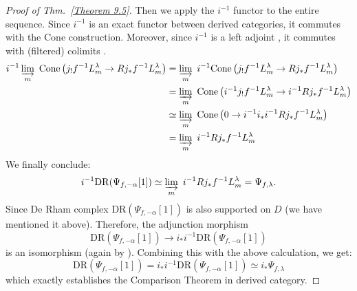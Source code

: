 \begin{proof}[Proof of Thm.~\ref{Theorem 9.5}]
    Then we apply the $i^{-1}$ functor to the entire sequence. Since $i^{-1}$ is an exact functor between derived categories,
    it commutes with the Cone construction. Moreover, since $i^{-1}$ is a left adjoint \cite[\href{https://stacks.math.columbia.edu/tag/00AD}{Tag 00AD}]{stacks-project},
    it commutes with (filtered) colimits \cite[\href{https://stacks.math.columbia.edu/tag/0038}{Tag 0038}]{stacks-project}.
    \begin{align*}
        i^{-1}\varinjlim_m\ \mathrm{Cone}\left(j_! f^{-1} L_m^{\lambda} \rightarrow R j_* f^{-1} L_m^{\lambda}\right) & = \varinjlim_m\ i^{-1}\mathrm{Cone}\left(j_! f^{-1} L_m^{\lambda} \rightarrow R j_* f^{-1} L_m^{\lambda}\right)       \\
                                                                                                                      & = \varinjlim_m\ \mathrm{Cone}\left(i^{-1}j_! f^{-1} L_m^{\lambda} \rightarrow i^{-1}R j_* f^{-1} L_m^{\lambda}\right) \\
                                                                                                                      & \simeq \varinjlim_m\ \mathrm{Cone}\left(0 \to i^{-1}i_*i^{-1} Rj_*f^{-1}L_m^{\lambda}\right)                          \\
                                                                                                                      & = \varinjlim_m\ i^{-1} Rj_*f^{-1}L_m^{\lambda}
    \end{align*}
    We finally conclude:
    \[
        i^{-1} \mathrm{DR}(\Psi_{f,-\alpha}[1]) \simeq \varinjlim_m\ i^{-1} Rj_*f^{-1}L_m^{\lambda} = \Psi_{f,\lambda}.
    \]
    Since De Rham complex $\mathrm{DR}(\Psi_{f,-\alpha}[1])$ is also supported on $D$ (we have mentioned it above).
    Therefore, the adjunction morphism
    \[
        \mathrm{DR}(\Psi_{f,-\alpha}[1]) \to i_* i^{-1} \mathrm{DR}(\Psi_{f,-\alpha}[1])
    \]
    is an isomorphism (again by \cite[\href{https://stacks.math.columbia.edu/tag/00AG}{Tag 00AG}]{stacks-project}).
    Combining this with the above calculation, we get:
    \[
        \mathrm{DR}(\Psi_{f,-\alpha}[1]) = i_* i^{-1} \mathrm{DR}(\Psi_{f,-\alpha}[1]) \simeq i_* \Psi_{f,\lambda}
    \]
    which exactly establishes the Comparison Theorem in derived category.

    \medskip


\end{proof}
